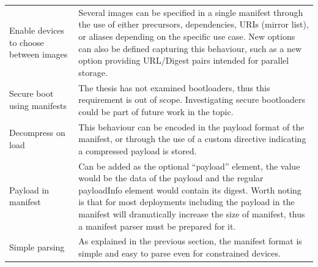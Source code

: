 \documentclass[0-thesis.tex]{subfiles}
\begin{document}
\begin{longtable}[]{@{}ll@{}}
    \begin{minipage}[t]{0.41\columnwidth}\raggedright\strut
    Enable devices to choose between images\strut
    \end{minipage} & \begin{minipage}[t]{0.53\columnwidth}\raggedright\strut
    Several images can be specified in a single manifest through the use of
    either precursors, dependencies, URIs (mirror list), or aliases
    depending on the specific use case. New options can also be defined
    capturing this behaviour, such as a new option providing URL/Digest
    pairs intended for parallel storage.\strut
    \end{minipage}\tabularnewline
    \begin{minipage}[t]{0.41\columnwidth}\raggedright\strut
    Secure boot using manifests\strut
    \end{minipage} & \begin{minipage}[t]{0.53\columnwidth}\raggedright\strut
    The thesis has not examined bootloaders, thus this requirement is out of
    scope. Investigating secure bootloaders could be part of future work in
    the topic.\strut
    \end{minipage}\tabularnewline
    \begin{minipage}[t]{0.41\columnwidth}\raggedright\strut
    Decompress on load\strut
    \end{minipage} & \begin{minipage}[t]{0.53\columnwidth}\raggedright\strut
    This behaviour can be encoded in the payload format of the manifest, or
    through the use of a custom directive indicating a compressed payload is
    stored.\strut
    \end{minipage}\tabularnewline
    \begin{minipage}[t]{0.41\columnwidth}\raggedright\strut
    Payload in manifest\strut
    \end{minipage} & \begin{minipage}[t]{0.53\columnwidth}\raggedright\strut
    Can be added as the optional ``payload'' element, the value would be the
    data of the payload and the regular payloadInfo element would contain
    its digest. Worth noting is that for most deployments including the
    payload in the manifest will dramatically increase the size of manifest,
    thus a manifest parser must be prepared for it.\strut
    \end{minipage}\tabularnewline
    \begin{minipage}[t]{0.41\columnwidth}\raggedright\strut
    Simple parsing\strut
    \end{minipage} & \begin{minipage}[t]{0.53\columnwidth}\raggedright\strut
    As explained in the previous section, the manifest format is simple and
    easy to parse even for constrained devices.\strut
    \end{minipage}\tabularnewline
    \bottomrule
\end{longtable}
\end{document}
